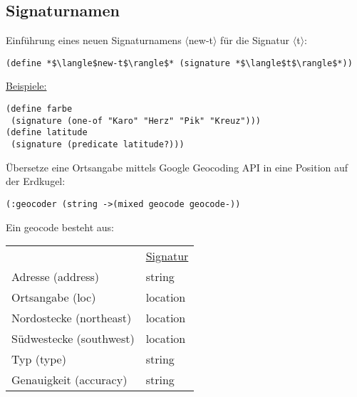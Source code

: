 \documentclass[a4paper,12pt]{article}
\begin{document}
\subsection{Signaturnamen}
Einführung eines neuen Signaturnamens $\langle$new-t$\rangle$ für die Signatur $\langle$t$\rangle$:
\begin{lstlisting}[style=customc]
(define *$\langle$new-t$\rangle$* (signature *$\langle$t$\rangle$*))
\end{lstlisting}
\uline{Beispiele:}
\begin{lstlisting}[style=customc]
(define farbe
 (signature (one-of "Karo" "Herz" "Pik" "Kreuz")))
(define latitude
 (signature (predicate latitude?)))
\end{lstlisting}
Übersetze eine Ortsangabe mittels Google Geocoding
API in eine Position auf der Erdkugel:\\
\begin{lstlisting}[style=customc]
(:geocoder (string ->(mixed geocode geocode-))
\end{lstlisting}
Ein geocode besteht aus:\\
\begin{tabular}{ll}                    
 &							\uline{Signatur}\\
 Adresse (address)			&	string\\
 Ortsangabe (loc)			&	location\\
 Nordostecke (northeast)	&	location\\
 Südwestecke (southwest)	&	location\\
 Typ (type) 				&	string\\
 Genauigkeit (accuracy) 	&	string\\
\end{tabular}
\end{document}
